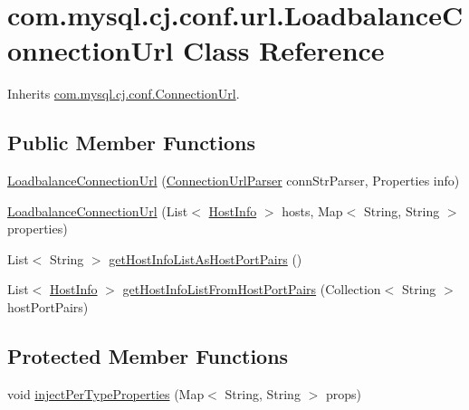 \hypertarget{classcom_1_1mysql_1_1cj_1_1conf_1_1url_1_1_loadbalance_connection_url}{}\section{com.\+mysql.\+cj.\+conf.\+url.\+Loadbalance\+Connection\+Url Class Reference}
\label{classcom_1_1mysql_1_1cj_1_1conf_1_1url_1_1_loadbalance_connection_url}


Inherits \mbox{\hyperlink{classcom_1_1mysql_1_1cj_1_1conf_1_1_connection_url}{com.\+mysql.\+cj.\+conf.\+Connection\+Url}}.

\subsection*{Public Member Functions}
\begin{DoxyCompactItemize}
\item 
\mbox{\hyperlink{classcom_1_1mysql_1_1cj_1_1conf_1_1url_1_1_loadbalance_connection_url_a4605af8a5c29a64ccae2a95c7939aa0e}{Loadbalance\+Connection\+Url}} (\mbox{\hyperlink{classcom_1_1mysql_1_1cj_1_1conf_1_1_connection_url_parser}{Connection\+Url\+Parser}} conn\+Str\+Parser, Properties info)
\item 
\mbox{\hyperlink{classcom_1_1mysql_1_1cj_1_1conf_1_1url_1_1_loadbalance_connection_url_a8e0a1ab2578683671fdad2dea60f78cc}{Loadbalance\+Connection\+Url}} (List$<$ \mbox{\hyperlink{classcom_1_1mysql_1_1cj_1_1conf_1_1_host_info}{Host\+Info}} $>$ hosts, Map$<$ String, String $>$ properties)
\item 
List$<$ String $>$ \mbox{\hyperlink{classcom_1_1mysql_1_1cj_1_1conf_1_1url_1_1_loadbalance_connection_url_aef6df049be461b78b04250d9af6b1c11}{get\+Host\+Info\+List\+As\+Host\+Port\+Pairs}} ()
\item 
List$<$ \mbox{\hyperlink{classcom_1_1mysql_1_1cj_1_1conf_1_1_host_info}{Host\+Info}} $>$ \mbox{\hyperlink{classcom_1_1mysql_1_1cj_1_1conf_1_1url_1_1_loadbalance_connection_url_ae11ed3f5bc2bbc455c5c311d1b783a60}{get\+Host\+Info\+List\+From\+Host\+Port\+Pairs}} (Collection$<$ String $>$ host\+Port\+Pairs)
\end{DoxyCompactItemize}
\subsection*{Protected Member Functions}
\begin{DoxyCompactItemize}
\item 
void \mbox{\hyperlink{classcom_1_1mysql_1_1cj_1_1conf_1_1url_1_1_loadbalance_connection_url_a01cbac35769ac60701e6ca72290025bd}{inject\+Per\+Type\+Properties}} (Map$<$ String, String $>$ props)
\end{DoxyCompactItemize}
